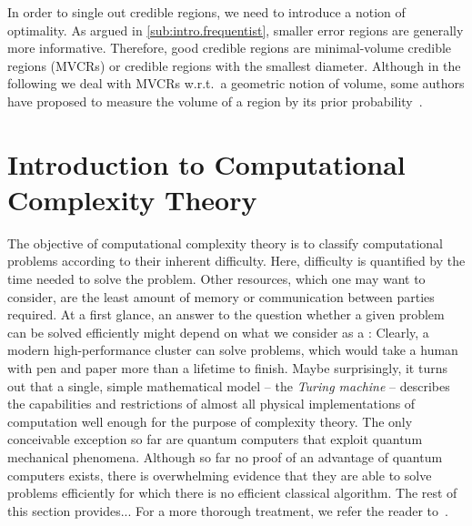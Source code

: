 In order to single out  credible regions, we need to introduce a notion of optimality.
As argued in \cref{sub:intro.frequentist}, smaller error regions are generally more informative.
Therefore, good credible regions are minimal-volume credible regions (MVCRs) or credible regions with the smallest diameter.
Although in the following we deal with MVCRs w.r.t.\ a geometric notion of volume, some authors have proposed to measure the volume of a region by its prior probability~\cite{Evans_2006_Optimally,Shang_2013_Optimal}.






\section{Introduction to Computational Complexity Theory}
\label{sec:error.complexity}


The objective of computational complexity theory is to classify computational problems according to their inherent difficulty.
Here, difficulty is quantified by the time needed to solve the problem.
Other resources, which one may want to consider, are the least amount of memory or communication between parties required.
At a first glance, an answer to the question whether a given problem can be solved efficiently might depend on what we consider as a :
Clearly, a modern high-performance cluster can solve problems, which would take a human with pen and paper more than a lifetime to finish.
Maybe surprisingly, it turns out that a single, simple mathematical model -- the \emph{Turing machine} -- describes the capabilities and restrictions of almost all physical implementations of computation well enough for the purpose of complexity theory.
The only conceivable exception so far are quantum computers that exploit quantum mechanical phenomena.
Although so far no proof of an advantage of quantum computers exists, there is overwhelming evidence that they are able to solve problems efficiently for which there is no efficient classical algorithm.
The rest of this section provides...
For a more thorough treatment, we refer the reader to~\cite{Arora_2009_Computational}.


